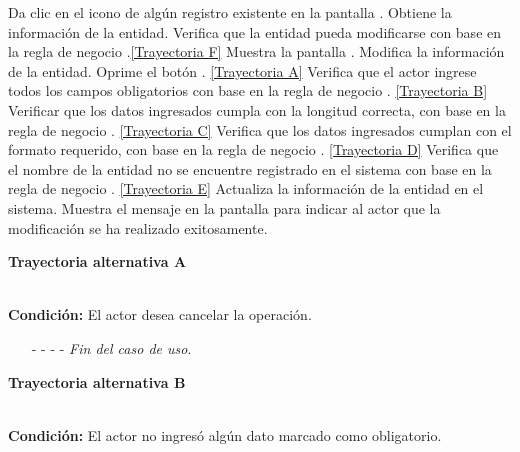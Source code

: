 	\begin{UCtrayectoria}
		\UCpaso[\UCactor] Da clic en el icono \editar de algún registro existente en la pantalla .
		\UCpaso[\UCsist] Obtiene la información de la entidad.
		\UCpaso[\UCsist] Verifica que la entidad pueda modificarse con base en la regla de negocio .\hyperlink{CU7-2:TAF}{[Trayectoria F]}
		\UCpaso[\UCsist] Muestra la pantalla . \label{CU7.2-P4}
		\UCpaso[\UCactor] Modifica la información de la entidad. \label{CU7.2-P5}
		\UCpaso[\UCactor] Oprime el botón . \hyperlink{CU7-2:TAA}{[Trayectoria A]}
		\UCpaso[\UCsist] Verifica que el actor ingrese todos los campos obligatorios con base en la regla de negocio . \hyperlink{CU7-2:TAB}{[Trayectoria B]}
		\UCpaso[\UCsist] Verificar que los datos ingresados cumpla con la longitud correcta, con base en la regla de negocio . \hyperlink{CU7-2:TAC}{[Trayectoria C]}
		\UCpaso[\UCsist] Verifica que los datos ingresados cumplan con el formato requerido, con base en la regla de negocio . \hyperlink{CU7-2:TAD}{[Trayectoria D]}
		\UCpaso[\UCsist] Verifica que el nombre de la entidad no se encuentre registrado en el sistema con base en la regla de negocio . \hyperlink{CU7-2:TAE}{[Trayectoria E]} 
		\UCpaso[\UCsist] Actualiza la información de la entidad en el sistema.
		\UCpaso[\UCsist] Muestra el mensaje  en la pantalla  para indicar al actor que la modificación se ha realizado exitosamente.
	\end{UCtrayectoria}		
\hypertarget{CU7-2:TAA}{\textbf{Trayectoria alternativa A}}\\
\noindent \textbf{Condición:} El actor desea cancelar la operación.
\begin{enumerate}
	\UCpaso[\UCactor] Solicita cancelar la operación oprimiendo el botón  de la pantalla 
	\UCpaso[\UCsist] Muestra la pantalla .
	\item[- -] - - {\em {Fin del caso de uso}}.%
\end{enumerate}
\hypertarget{CU7-2:TAB}{\textbf{Trayectoria alternativa B}}\\
\noindent \textbf{Condición:} El actor no ingresó algún dato marcado como obligatorio.
